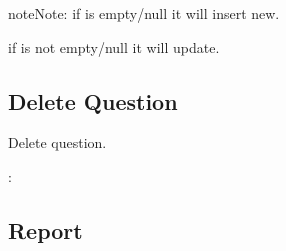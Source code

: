 \documentclass[letterpaper,10pt,english,openany,oneside]{sphinxmanual}
\begin{document}
\begin{sphinxadmonition}{note}{Note:}
\sphinxAtStartPar
if  is empty/null it will insert new.

\sphinxAtStartPar
if  is not empty/null it will update.
\end{sphinxadmonition}


\subsection{Delete Question}
\label{\detokenize{api-qa/v1:delete-question}}

\begin{fulllineitems}
\label{\detokenize{api-qa/v1:post--api-qa-v1-VMW-delete}}
\sphinxAtStartPar
Delete question.

\sphinxAtStartPar
{}:

\begin{sphinxVerbatim}[commandchars=\\\{\}]
   
\end{sphinxVerbatim}

\end{fulllineitems}



\subsection{Report}
\label{\detokenize{api-qa/v1:report}}
\end{document}

